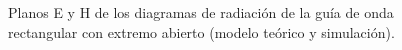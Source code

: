 \begin{figure} [H]
\centering 
{}
\hspace{5mm}
\caption{Planos E y H de los diagramas de radiación de la guía de onda rectangular con extremo abierto (modelo teórico y simulación).}
\label{grup_fig_estudio:12}
\end{figure}
